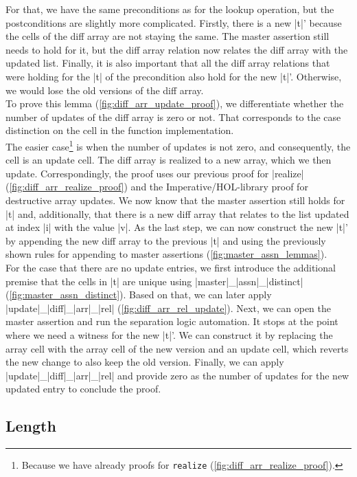 \noindent For that, we have the same preconditions as for the lookup operation, but the postconditions are slightly more complicated. Firstly, there is a new |t|' because the cells of the diff array are not staying the same. The master assertion still needs to hold for it, but the diff array relation now relates the diff array with the updated list. Finally, it is also important that all the diff array relations that were holding for the |t| of the precondition also hold for the new |t|'. Otherwise, we would lose the old versions of the diff array.\\
To prove this lemma (\autoref{fig:diff_arr_update_proof}), we differentiate whether the number of updates of the diff array is zero or not. That corresponds to the case distinction on the cell in the function implementation.\\
The easier case\footnote{Because we have already proofs for \lstinline!realize! (\autoref{fig:diff_arr_realize_proof}).} is when the number of updates is not zero, and consequently, the cell is an update cell. The diff array is realized to a new array, which we then update. Correspondingly, the proof uses our previous proof for |realize| (\autoref{fig:diff_arr_realize_proof}) and the Imperative/HOL-library proof for destructive array updates. We now know that the master assertion still holds for |t| and, additionally, that there is a new diff array that relates to the list updated at index |i| with the value |v|. As the last step, we can now construct the new |t|' by appending the new diff array to the previous |t| and using the previously shown rules for appending to master assertions (\autoref{fig:master_assn_lemmas}).\\
For the case that there are no update entries, we first introduce the additional premise that the cells in |t| are unique using |master|\_|assn|\_|distinct| (\autoref{fig:master_assn_distinct}). Based on that, we can later apply |update|\_|diff|\_|arr|\_|rel| (\autoref{fig:diff_arr_rel_update}). Next, we can open the master assertion and run the separation logic automation. It stops at the point where we need a witness for the new |t|'. We can construct it by replacing the array cell with the array cell of the new version and an update cell, which reverts the new change to also keep the old version. Finally, we can apply |update|\_|diff|\_|arr|\_|rel| and provide zero as the number of updates for the new updated entry to conclude the proof.

\subsection{Length}

